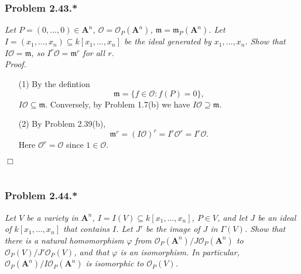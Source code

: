 \documentclass{article}
\begin{document}



\subsubsection*{Problem 2.43.*}
\emph{Let $P = (0, \ldots, 0) \in \mathbf{A}^{n}$,
$\mathscr{O} = \mathscr{O}_P(\mathbf{A}^{n})$,
$\mathfrak{m} = \mathfrak{m}_P(\mathbf{A}^{n})$.
Let $I = (x_1, \ldots, x_n) \subseteq k[x_1,\ldots,x_n]$ be the ideal generated by $x_1, \ldots, x_n$.
Show that $I\mathscr{O} = \mathfrak{m}$,
so $I^r \mathscr{O} = \mathfrak{m}^r$ for all $r$.} \\



\emph{Proof.}
\begin{enumerate}
\item[(1)]
  By the defintion
  \[
    \mathfrak{m} = \{ f \in \mathscr{O} : f(P) = 0 \},
  \]
  $I\mathscr{O} \subseteq \mathfrak{m}$.
  Conversely, by Problem 1.7(b) we have $I\mathscr{O} \supseteq \mathfrak{m}$.

\item[(2)]
  By Problem 2.39(b),
  \[
    \mathfrak{m}^r
    = (I\mathscr{O})^r
    = I^r \mathscr{O}^r
    = I^r \mathscr{O}.
  \]
  Here $\mathscr{O}^r = \mathscr{O}$ since $1 \in \mathscr{O}$.
\end{enumerate}
$\Box$ \\\\






\subsubsection*{Problem 2.44.*}
\emph{Let $V$ be a variety in $\mathbf{A}^{n}$,
$I = I(V) \subseteq k[x_1,\ldots,x_n]$, $P \in V$,
and let $J$ be an ideal of $k[x_1,\ldots,x_n]$ that contains $I$.
Let $J'$ be the image of $J$ in $\Gamma(V)$.
Show that there is a natural homomorphism $\varphi$ from
$\mathscr{O}_P(\mathbf{A}^{n}) / J\mathscr{O}_P(\mathbf{A}^{n})$
to $\mathscr{O}_P(V) / J'\mathscr{O}_P(V)$,
and that $\varphi$ is an isomorphism.
In particular, $\mathscr{O}_P(\mathbf{A}^{n}) / I\mathscr{O}_P(\mathbf{A}^{n})$
is isomorphic to $\mathscr{O}_P(V)$.} \\
\end{document}
